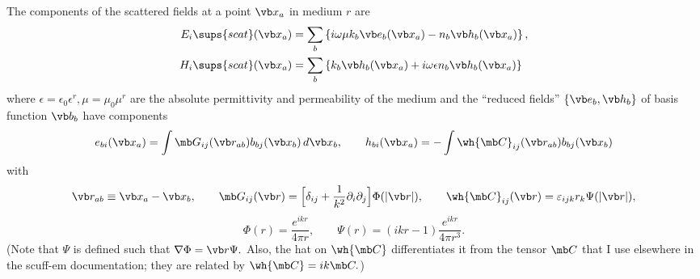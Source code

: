 The components of the scattered fields at a point $\vb x_a$ in 
medium $r$ are
\begin{align*}
 E_i\sups{scat}(\vb x_a)
 &= \sum_b \left\{ i\omega \mu k_b \vb e_b(\vb x_a)
                   -n_b \vb h_b(\vb x_a) \right\},
\\
 H_i\sups{scat}(\vb x_a)
 &= \sum_b \left\{  k_b \vb h_b(\vb x_a) 
                   +i\omega \epsilon n_b \vb h_b(\vb x_a) \right\}
\end{align*}
where $\epsilon=\epsilon_0\epsilon^r,\mu=\mu_0\mu^r$ are the absolute 
permittivity and permeability of the medium and the 
``reduced fields'' $\{\vb e_b, \vb h_b\}$ of basis function $\vb b_b$ 
have components
$$ e_{bi}(\vb x_a) =
   \int \mb G_{ij}(\vb r_{ab})b_{bj}(\vb x_b)\,d\vb x_b, 
  \qquad
   h_{bi}(\vb x_a) =
   -\int \wh{\mb C}_{ij}(\vb r_{ab})b_{bj}(\vb x_b)
$$
with
$$\vb r_{ab} \equiv \vb x_a - \vb x_b, 
  \qquad
  \mb G_{ij}(\vb r) 
   = \Big[ \delta_{ij} + \frac{1}{k^2}\partial_i\partial_j\Big]\Phi(|\vb r|),
  \qquad
  \wh{\mb C}_{ij}(\vb r) = \varepsilon_{ijk} r_k \Psi(|\vb r|), 
$$
$$ \Phi(r) = \frac{e^{ikr}}{4\pi r}, 
   \qquad 
   \Psi(r) = (ikr-1)\frac{e^{ikr}}{4\pi r^3}.
$$
(Note that $\Psi$ is defined such that $\nabla \Phi=\vb r\Psi.$
Also, the hat on $\wh{\mb C}$ differentiates it from the tensor $\mb C$
that I use elsewhere in the {\sc scuff-em} documentation;
they are related by $\wh{\mb C}=ik\mb C.$)

